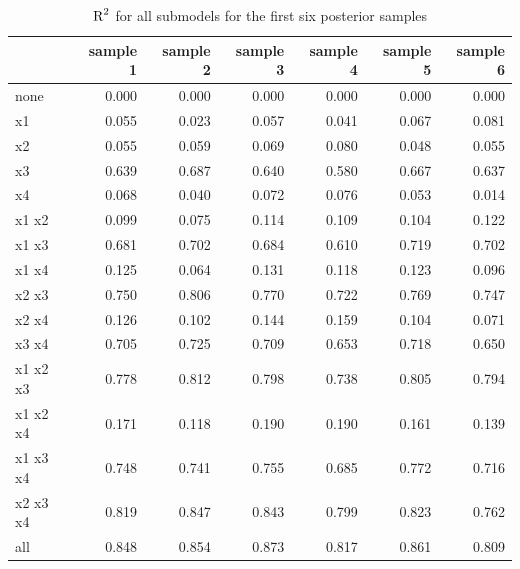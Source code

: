 \documentclass[11pt,a4paper,twoside]{book}\usepackage[]{graphicx}\usepackage[]{color}
\newenvironment{knitrout}{}{} %
\begin{document}
\begin{knitrout}
\color{fgcolor}\begin{table}

\caption{\label{tab:simdata.postsample3}$ \text{R}^2$ for all submodels for the first six posterior samples}
\centering
\begin{tabular}[t]{lrrrrrr}
\toprule
  & sample 1 & sample 2 & sample 3 & sample 4 & sample 5 & sample 6\\
\midrule
none & 0.000 & 0.000 & 0.000 & 0.000 & 0.000 & 0.000\\
x1 & 0.055 & 0.023 & 0.057 & 0.041 & 0.067 & 0.081\\
x2 & 0.055 & 0.059 & 0.069 & 0.080 & 0.048 & 0.055\\
x3 & 0.639 & 0.687 & 0.640 & 0.580 & 0.667 & 0.637\\
x4 & 0.068 & 0.040 & 0.072 & 0.076 & 0.053 & 0.014\\
x1 x2 & 0.099 & 0.075 & 0.114 & 0.109 & 0.104 & 0.122\\
x1 x3 & 0.681 & 0.702 & 0.684 & 0.610 & 0.719 & 0.702\\
x1 x4 & 0.125 & 0.064 & 0.131 & 0.118 & 0.123 & 0.096\\
x2 x3 & 0.750 & 0.806 & 0.770 & 0.722 & 0.769 & 0.747\\
x2 x4 & 0.126 & 0.102 & 0.144 & 0.159 & 0.104 & 0.071\\
x3 x4 & 0.705 & 0.725 & 0.709 & 0.653 & 0.718 & 0.650\\
x1 x2 x3 & 0.778 & 0.812 & 0.798 & 0.738 & 0.805 & 0.794\\
x1 x2 x4 & 0.171 & 0.118 & 0.190 & 0.190 & 0.161 & 0.139\\
x1 x3 x4 & 0.748 & 0.741 & 0.755 & 0.685 & 0.772 & 0.716\\
x2 x3 x4 & 0.819 & 0.847 & 0.843 & 0.799 & 0.823 & 0.762\\
all & 0.848 & 0.854 & 0.873 & 0.817 & 0.861 & 0.809\\
\bottomrule
\end{tabular}
\end{table}


\end{knitrout}
\end{document}
